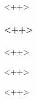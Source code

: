 
\begin{frame}{<++>}
	\framesubtitle{<++>}
	\begin{block}{<++>}
	\end{block}
	\begin{block}{<++>}
	\end{block}
\end{frame}
<++>

